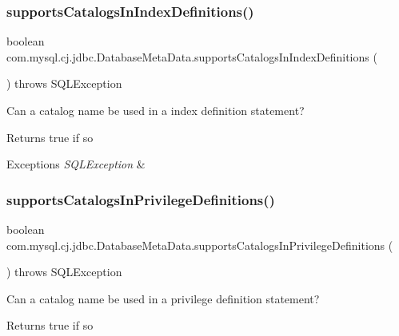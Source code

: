 \subsubsection{\texorpdfstring{supports\+Catalogs\+In\+Index\+Definitions()}{supportsCatalogsInIndexDefinitions()}}
{\footnotesize\ttfamily boolean com.\+mysql.\+cj.\+jdbc.\+Database\+Meta\+Data.\+supports\+Catalogs\+In\+Index\+Definitions (\begin{DoxyParamCaption}{ }\end{DoxyParamCaption}) throws S\+Q\+L\+Exception}

Can a catalog name be used in a index definition statement?

\begin{DoxyReturn}{Returns}
true if so 
\end{DoxyReturn}

\begin{DoxyExceptions}{Exceptions}
{\em S\+Q\+L\+Exception} & \\
\hline
\end{DoxyExceptions}
\mbox{\label{classcom_1_1mysql_1_1cj_1_1jdbc_1_1_database_meta_data_acee80a8f185e02074a5c218e8260ecbe}} 
\subsubsection{\texorpdfstring{supports\+Catalogs\+In\+Privilege\+Definitions()}{supportsCatalogsInPrivilegeDefinitions()}}
{\footnotesize\ttfamily boolean com.\+mysql.\+cj.\+jdbc.\+Database\+Meta\+Data.\+supports\+Catalogs\+In\+Privilege\+Definitions (\begin{DoxyParamCaption}{ }\end{DoxyParamCaption}) throws S\+Q\+L\+Exception}

Can a catalog name be used in a privilege definition statement?

\begin{DoxyReturn}{Returns}
true if so 
\end{DoxyReturn}


